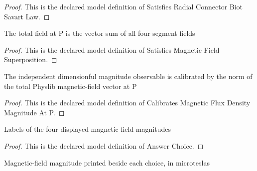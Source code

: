 \begin{proof}
  This is the declared model definition of Satisfies Radial Connector Biot Savart Law.
\end{proof}
\begin{definition}
  \label{def:physics:phyx-mini-0966:phyxminiproblems-problemphyxmini0966-satisfiesmagneticfieldsuperposition}
  The total field at P is the vector sum of all four segment fields
\end{definition}
\begin{proof}
  This is the declared model definition of Satisfies Magnetic Field Superposition.
\end{proof}
\begin{definition}
  \label{def:physics:phyx-mini-0966:phyxminiproblems-problemphyxmini0966-calibratesmagneticfluxdensitymagnitudeatp}
  The independent dimensionful magnitude observable is calibrated by the norm of the total Physlib magnetic-field vector at P
\end{definition}
\begin{proof}
  This is the declared model definition of Calibrates Magnetic Flux Density Magnitude At P.
\end{proof}
\begin{definition}
  \label{def:physics:phyx-mini-0966:phyxminiproblems-problemphyxmini0966-answerchoice}
  Labels of the four displayed magnetic-field magnitudes
\end{definition}
\begin{proof}
  This is the declared model definition of Answer Choice.
\end{proof}
\begin{definition}
  \label{def:physics:phyx-mini-0966:phyxminiproblems-problemphyxmini0966-displayedmagneticfieldinmicroteslas}
  Magnetic-field magnitude printed beside each choice, in microteslas
\end{definition}
